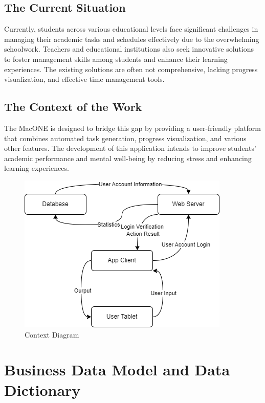 \documentclass[12pt]{article}
\begin{document}
\subsection{The Current Situation}
Currently, students across various educational levels face significant challenges in managing their academic tasks and schedules effectively due to the overwhelming schoolwork. Teachers and educational institutions also seek innovative solutions to foster management skills among students and enhance their learning experiences. The existing solutions are often not comprehensive, lacking progress visualization, and effective time management tools.

\subsection{The Context of the Work} 
The MacONE is designed to bridge this gap by providing a user-friendly platform that combines automated task generation, progress visualization, and various other features. The development of this application intends to improve students' academic performance and mental well-being by reducing stress and enhancing learning experiences. 
\begin{figure}[htbp]
    \centering
    \includegraphics[width=0.9\linewidth]{Context Diagram.drawio.png} 
    \caption{Context Diagram}
\end{figure}


\section{Business Data Model and Data Dictionary}
\end{document}
